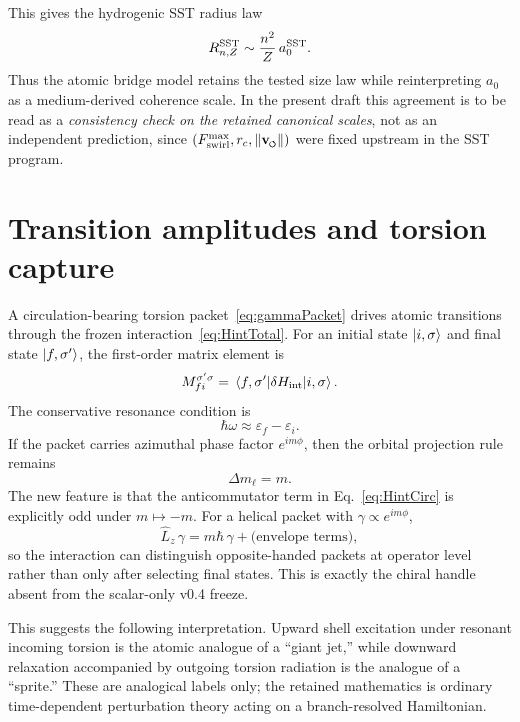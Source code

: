 \documentclass[11pt,a4paper]{article}
\newcommand{\swirlarrow}{\mathchoice{\mkern-2mu\scriptstyle\boldsymbol{\circlearrowleft}}{\mkern-2mu\scriptstyle\boldsymbol{\circlearrowleft}}{\mkern-2mu\scriptscriptstyle\boldsymbol{\circlearrowleft}}{\mkern-2mu\scriptscriptstyle\boldsymbol{\circlearrowleft}}}
\newcommand{\vswirl}{\mathbf{v}_{\swirlarrow}}
\newcommand{\rc}{r_c}
\begin{document}
This gives the hydrogenic SST radius law
\begin{equation}
\label{eq:RnZ}
R_{n,Z}^{\rm SST}\sim \frac{n^2}{Z}\,a_0^{\rm SST}.
\end{equation}
Thus the atomic bridge model retains the tested size law while reinterpreting $a_0$ as a medium-derived coherence scale. In the present draft this agreement is to be read as a \emph{consistency check on the retained canonical scales}, not as an independent prediction, since $(F_{\rm swirl}^{\max},\rc,\lVert\vswirl\rVert)$ were fixed upstream in the SST program.

\section{Transition amplitudes and torsion capture}
A circulation-bearing torsion packet~\eqref{eq:gammaPacket} drives atomic transitions through the frozen interaction~\eqref{eq:HintTotal}. For an initial state $\ket{i,\sigma}$ and final state $\ket{f,\sigma'}$, the first-order matrix element is
\begin{equation}
\label{eq:Mfi}
M_{fi}^{\sigma'\sigma}=\matrixel{f,\sigma'}{\delta H_{\rm int}}{i,\sigma}.
\end{equation}
The conservative resonance condition is
\begin{equation}
\label{eq:resonance}
\hbar\omega \approx \varepsilon_f-\varepsilon_i.
\end{equation}
If the packet carries azimuthal phase factor $e^{im\phi}$, then the orbital projection rule remains
\begin{equation}
\label{eq:dm}
\Delta m_\ell = m.
\end{equation}
The new feature is that the anticommutator term in Eq.~\eqref{eq:HintCirc} is explicitly odd under $m\mapsto -m$. For a helical packet with $\gamma\propto e^{im\phi}$,
\begin{equation}
\label{eq:Lzgamma}
\hat L_z\,\gamma = m\hbar\,\gamma + \text{(envelope terms)},
\end{equation}
so the interaction can distinguish opposite-handed packets at operator level rather than only after selecting final states. This is exactly the chiral handle absent from the scalar-only v0.4 freeze.

This suggests the following interpretation. Upward shell excitation under resonant incoming torsion is the atomic analogue of a ``giant jet,'' while downward relaxation accompanied by outgoing torsion radiation is the analogue of a ``sprite.'' These are analogical labels only; the retained mathematics is ordinary time-dependent perturbation theory acting on a branch-resolved Hamiltonian.
\end{document}
